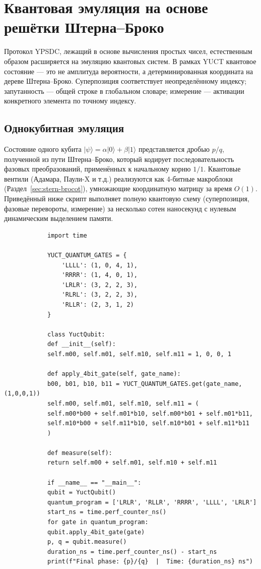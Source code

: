\documentclass[12pt,a4paper]{article}
\begin{document}
	\section{Квантовая эмуляция на основе решётки Штерна–Броко}
	\label{sec:quantum-emulation}
	
	Протокол YPSDC, лежащий в основе вычисления простых чисел, естественным образом расширяется на эмуляцию квантовых систем. В рамках YUCT квантовое состояние — это не амплитуда вероятности, а детерминированная координата на дереве Штерна–Броко. Суперпозиция соответствует неопределённому индексу; запутанность — общей строке в глобальном словаре; измерение — активации конкретного элемента по точному индексу.
	
	\subsection{Однокубитная эмуляция}
	
	Состояние одного кубита \(\vert\psi\rangle = \alpha\vert0\rangle + \beta\vert1\rangle\) представляется дробью \(p/q\), полученной из пути Штерна–Броко, который кодирует последовательность фазовых преобразований, применённых к начальному корню \(1/1\). Квантовые вентили (Адамара, Паули-X и т.д.) реализуются как 4-битные макроблоки (Раздел~\ref{sec:stern-brocot}), умножающие координатную матрицу за время \(O(1)\). Приведённый ниже скрипт выполняет полную квантовую схему (суперпозиция, фазовые перевороты, измерение) за несколько сотен наносекунд с нулевым динамическим выделением памяти.
	
	\begin{tcolorbox}[title=Однокубитный эмулятор YUCT (Python), breakable]
		\begin{lstlisting}
			import time
			
			YUCT_QUANTUM_GATES = {
				'LLLL': (1, 0, 4, 1),
				'RRRR': (1, 4, 0, 1),
				'LRLR': (3, 2, 2, 3),
				'RLRL': (3, 2, 2, 3),
				'RLLR': (2, 3, 1, 2)
			}
			
			class YuctQubit:
			def __init__(self):
			self.m00, self.m01, self.m10, self.m11 = 1, 0, 0, 1
			
			def apply_4bit_gate(self, gate_name):
			b00, b01, b10, b11 = YUCT_QUANTUM_GATES.get(gate_name, (1,0,0,1))
			self.m00, self.m01, self.m10, self.m11 = (
			self.m00*b00 + self.m01*b10, self.m00*b01 + self.m01*b11,
			self.m10*b00 + self.m11*b10, self.m10*b01 + self.m11*b11
			)
			
			def measure(self):
			return self.m00 + self.m01, self.m10 + self.m11
			
			if __name__ == "__main__":
			qubit = YuctQubit()
			quantum_program = ['LRLR', 'RLLR', 'RRRR', 'LLLL', 'LRLR']
			start_ns = time.perf_counter_ns()
			for gate in quantum_program:
			qubit.apply_4bit_gate(gate)
			p, q = qubit.measure()
			duration_ns = time.perf_counter_ns() - start_ns
			print(f"Final phase: {p}/{q}  |  Time: {duration_ns} ns")
		\end{lstlisting}
	\end{tcolorbox}
	
\end{document}
